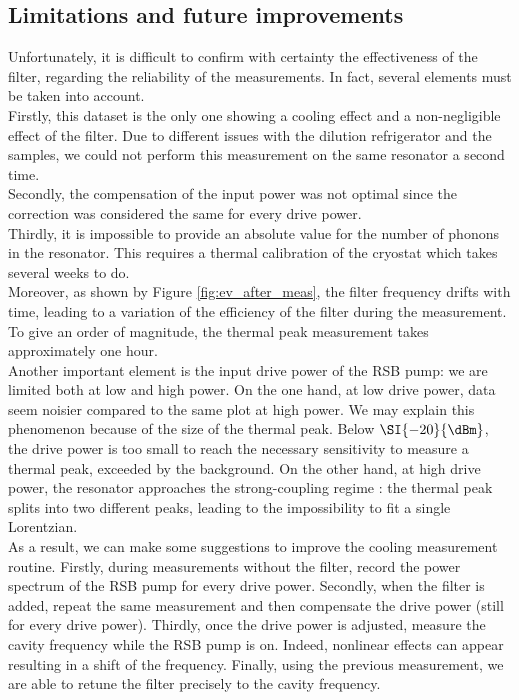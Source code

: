 \documentclass[11pt,a4pape,longbibliography]{article}
\begin{document}
\subsection{Limitations and future improvements}
\label{sec:limitations}

Unfortunately, it is difficult to confirm with certainty the effectiveness of the filter, regarding the reliability of the measurements. In fact, several elements must be taken into account.\\

Firstly, this dataset is the only one showing a cooling effect and a non-negligible effect of the filter. Due to different issues with the dilution refrigerator and the samples, we could not perform this measurement on the same resonator a second time.\\ 
Secondly, the compensation of the input power was not optimal since the correction was considered the same for every drive power.\\
Thirdly, it is impossible to provide an absolute value for the number of phonons in the resonator. This requires a thermal calibration of the cryostat which takes several weeks to do.\\ %
Moreover, as shown by Figure \ref{fig:ev_after_meas}, the filter frequency drifts with time, leading to a variation of the efficiency of the filter during the measurement. To give an order of magnitude, the thermal peak measurement takes approximately one hour.\\

Another important element is the input drive power of the RSB pump: we are limited both at low and high power. On the one hand, at low drive power, data seem noisier compared to the same plot at high power. We may explain this phenomenon because of the size of the thermal peak. Below $\SI{-20}{\dBm}$, the drive power is too small to reach the necessary sensitivity to measure a thermal peak, exceeded by the background. On the other hand, at high drive power, the resonator approaches the strong-coupling regime \cite{groeblacher_observation_2009}: the thermal peak splits into two different peaks, leading to the impossibility to fit a single Lorentzian.\\

As a result, we can make some suggestions to improve the cooling measurement routine. Firstly, during measurements without the filter, record the power spectrum of the RSB pump for every drive power. Secondly, when the filter is added, repeat the same measurement and then compensate the drive power (still for every drive power). Thirdly, once the drive power is adjusted, measure the cavity frequency while the RSB pump is on. Indeed, nonlinear effects can appear resulting in a shift of the frequency. Finally, using the previous measurement, we are able to retune the filter precisely to the cavity frequency.\\
\end{document}
